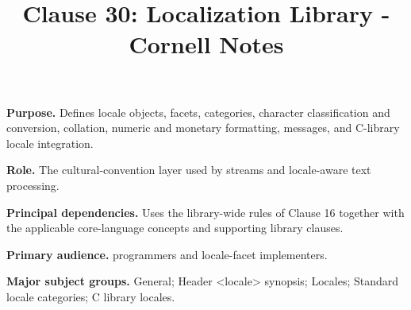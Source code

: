 \documentclass[11pt,letterpaper]{article}
\title{Clause 30: Localization Library - Cornell Notes}
\author{}
\date{}
\begin{document}
\maketitle
\begin{CornellReferenceOrientationBox}
\textbf{Purpose.} Defines locale objects, facets, categories, character classification and conversion, collation, numeric and monetary formatting, messages, and C-library locale integration.
\par\textbf{Role.} The cultural-convention layer used by streams and locale-aware text processing.
\par\textbf{Principal dependencies.} Uses the library-wide rules of Clause 16 together with the applicable core-language concepts and supporting library clauses.
\par\textbf{Primary audience.} programmers and locale-facet implementers.
\par\textbf{Major subject groups.} General; Header <locale> synopsis; Locales; Standard locale categories; C library locales.
\end{CornellReferenceOrientationBox}
\end{document}
